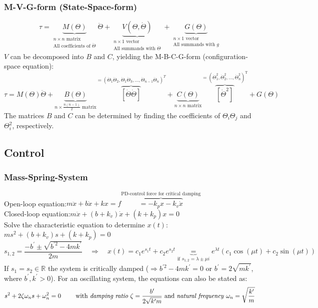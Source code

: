 \subsubsection{M-V-G-form (State-Space-form)}
$$
\tau=\underbrace{M(\Theta)}_{\substack{n\times n\text{ matrix}\\ \text{All coefficients of }\ddot{\Theta}}} \ddot{\Theta}
+\underbrace{V(\Theta, \dot{\Theta})}_{\substack{n\times 1\text{ vector}\\ \text{All summands with }\dot{\Theta}}}
+\underbrace{G(\Theta)}_{\substack{n\times 1\text{ vector}\\ \text{All summands with }g}}
$$
$V$ can be decomposed into $B$ and $C$, yielding the M-B-C-G-form (configuration-space equation):
$$
\tau=M(\Theta) \ddot{\Theta}
+\underbrace{B(\Theta)}_{n \times \frac{n(n-1)}{2}\text{ matrix}}\overbrace{[\dot{\Theta} \dot{\Theta}]}^{= \left(\dot{\Theta}_{1} \dot{\Theta}_{2}, \dot{\Theta}_{1} \dot{\Theta}_{3}, \ldots, \dot{\Theta}_{n-1} \dot{\Theta}_{n}\right)^T}
+\underbrace{C(\Theta)}_{n \times n\text{ matrix}}\overbrace{\left[\dot{\Theta}^{2}\right]}^{= \left(\dot{\Theta}_{1}^{2}, \dot{\Theta}_{2}^{2}, \ldots, \dot{\Theta}_{n}^{2}\right)^{\mathrm{T}}}
+G(\Theta)
$$
The matrices $B$ and $C$ can be determined by finding the coefficients of $\Theta_{i} \Theta_{j}$ and $\Theta_{i}^{2}$, respectively.

\subsection{Control}

\subsubsection{Mass-Spring-System}

Open-loop equation:\quad\quad\quad\quad $m \ddot{x}+b \dot{x}+k x=f\overbrace{=-k_{p} x-k_{v} \dot{x}}^{\text{PD-control force for critical damping}}$\\
Closed-loop equation:\quad\quad\quad $m \ddot{x}+\left(b+k_{v}\right) \dot{x}+\left(k+k_{p}\right) x=0$\\
Solve the characteristic equation to determine $x(t)$:\quad\quad\quad $m s^{2}+\left(b+k_{v}\right) s+\left(k+k_{p}\right)=0$
$$
s_{1,2}=\frac{-b^{\prime} \pm \sqrt{b^{\prime 2}-4 m k^{\prime}}}{2 m}\quad\Rightarrow\quad x(t)=c_{1} e^{s_{1} t}+c_{2} e^{s_{2} t}\underbrace{=}_{\text{if }s_{1,2}=\lambda\pm\mu i}e^{\lambda t}\left(c_{1} \cos (\mu t)+c_{2} \sin (\mu t)\right)
$$
If $s_{1}=s_{2} \in \mathbb{R}$ the system is critically damped ($\Rightarrow b^{\prime 2}-4 m k^{\prime}=0$ or $b^{\prime}=2 \sqrt{m k^{\prime}}$, where $b^{\prime}, k^{\prime}>0$). For an oscillating system, the equations can also be stated as:
$$s^{2}+2 \zeta \omega_{n} s+\omega_{n}^{2}=0 \quad\quad\text{ with \textit{damping ratio} }\zeta=\frac{b^{\prime}}{2 \sqrt{k^{\prime} m}}\text{ and \textit{natural frequency} }\omega_{n}=\sqrt{\frac{k^{\prime}}{m}}$$

